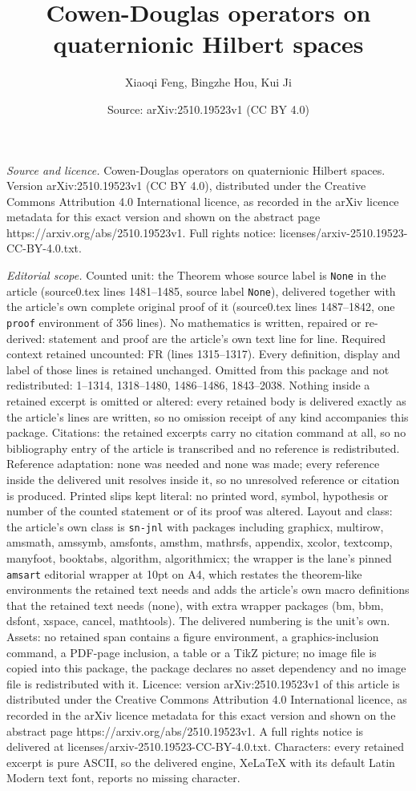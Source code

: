 \documentclass[10pt,a4paper]{amsart}
\title[Cowen-Douglas operators on quaternionic Hilbert spaces]{Cowen-Douglas operators on quaternionic Hilbert spaces}
\author{Xiaoqi Feng, Bingzhe Hou, Kui Ji}
\date{Source: arXiv:2510.19523v1 (CC BY 4.0)}
\begin{document}
\maketitle

\noindent\emph{Source and licence.} Cowen-Douglas operators on quaternionic Hilbert spaces. Version arXiv:2510.19523v1 (CC BY 4.0), distributed under the Creative Commons Attribution 4.0 International licence, as recorded in the arXiv licence metadata for this exact version and shown on the abstract page https://arxiv.org/abs/2510.19523v1. Full rights notice: licenses/arxiv-2510.19523-CC-BY-4.0.txt.\par\smallskip

\noindent\textit{Editorial scope.} Counted unit: the Theorem whose source label is \texttt{None} in the article (source0.tex lines 1481--1485, source label \texttt{None}), delivered together with the article's own complete original proof of it (source0.tex lines 1487--1842, one \texttt{proof} environment of 356 lines). No mathematics is written, repaired or re-derived: statement and proof are the article's own text line for line. Required context retained uncounted: FR (lines 1315--1317). Every definition, display and label of those lines is retained unchanged. Omitted from this package and not redistributed: 1--1314, 1318--1480, 1486--1486, 1843--2038. Nothing inside a retained excerpt is omitted or altered: every retained body is delivered exactly as the article's lines are written, so no omission receipt of any kind accompanies this package. Citations: the retained excerpts carry no citation command at all, so no bibliography entry of the article is transcribed and no reference is redistributed. Reference adaptation: none was needed and none was made; every reference inside the delivered unit resolves inside it, so no unresolved reference or citation is produced. Printed slips kept literal: no printed word, symbol, hypothesis or number of the counted statement or of its proof was altered. Layout and class: the article's own class is \texttt{sn-jnl} with packages including graphicx, multirow, amsmath, amssymb, amsfonts, amsthm, mathrsfs, appendix, xcolor, textcomp, manyfoot, booktabs, algorithm, algorithmicx; the wrapper is the lane's pinned \texttt{amsart} editorial wrapper at 10pt on A4, which restates the theorem-like environments the retained text needs and adds the article's own macro definitions that the retained text needs (none), with extra wrapper packages (bm, bbm, dsfont, xspace, cancel, mathtools). The delivered numbering is the unit's own. Assets: no retained span contains a figure environment, a graphics-inclusion command, a PDF-page inclusion, a table or a TikZ picture; no image file is copied into this package, the package declares no asset dependency and no image file is redistributed with it. Licence: version arXiv:2510.19523v1 of this article is distributed under the Creative Commons Attribution 4.0 International licence, as recorded in the arXiv licence metadata for this exact version and shown on the abstract page https://arxiv.org/abs/2510.19523v1. A full rights notice is delivered at licenses/arxiv-2510.19523-CC-BY-4.0.txt. Characters: every retained excerpt is pure ASCII, so the delivered engine, XeLaTeX with its default Latin Modern text font, reports no missing character.
\end{document}
